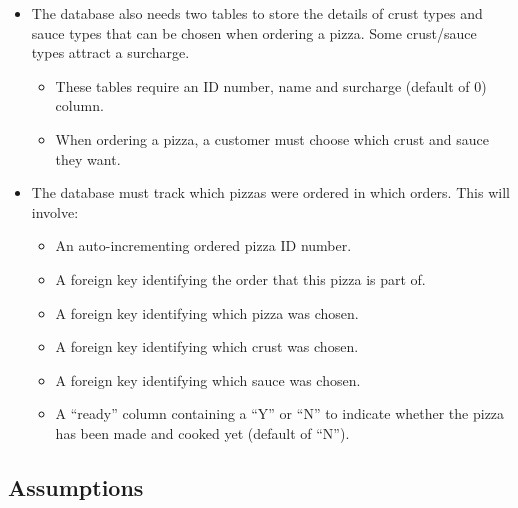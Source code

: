 \begin{itemize}
\item The database also needs two tables to store the details of crust types and sauce types that can be chosen when ordering a pizza. Some crust/sauce types attract a surcharge.
	\begin{itemize}
	\item These tables require an ID number, name and surcharge (default of 0) column.
	\item When ordering a pizza, a customer must choose which crust and sauce they want.
	\end{itemize}
\item The database must track which pizzas were ordered in which orders. This will involve:
	\begin{itemize}
	\item An auto-incrementing ordered pizza ID number.
	\item A foreign key identifying the order that this pizza is part of.
	\item A foreign key identifying which pizza was chosen.
	\item A foreign key identifying which crust was chosen.
	\item A foreign key identifying which sauce was chosen.
	\item A ``ready'' column containing a ``Y'' or ``N'' to indicate whether the pizza has been made and cooked yet (default of ``N'').
	\end{itemize}
\end{itemize}

\subsection{Assumptions}

